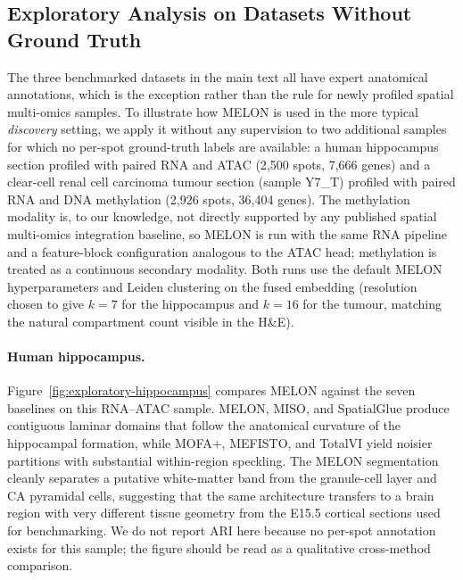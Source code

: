 \documentclass{article}
\theoremstyle{plain}
\theoremstyle{definition}
\begin{document}
\subsection{Exploratory Analysis on Datasets Without Ground Truth}\label{app:exploratory}
The three benchmarked datasets in the main text all have expert anatomical annotations, which is the exception rather than the rule for newly profiled spatial multi-omics samples. To illustrate how MELON is used in the more typical \emph{discovery} setting, we apply it without any supervision to two additional samples for which no per-spot ground-truth labels are available: a human hippocampus section profiled with paired RNA and ATAC (2{,}500 spots, 7{,}666 genes) and a clear-cell renal cell carcinoma tumour section (sample Y7\_T) profiled with paired RNA and DNA methylation (2{,}926 spots, 36{,}404 genes). The methylation modality is, to our knowledge, not directly supported by any published spatial multi-omics integration baseline, so MELON is run with the same RNA pipeline and a feature-block configuration analogous to the ATAC head; methylation is treated as a continuous secondary modality. Both runs use the default MELON hyperparameters and Leiden clustering on the fused embedding (resolution chosen to give $k{=}7$ for the hippocampus and $k{=}16$ for the tumour, matching the natural compartment count visible in the H\&E).

\paragraph{Human hippocampus.}
Figure~\ref{fig:exploratory-hippocampus} compares MELON against the seven baselines on this RNA--ATAC sample. MELON, MISO, and SpatialGlue produce contiguous laminar domains that follow the anatomical curvature of the hippocampal formation, while MOFA+, MEFISTO, and TotalVI yield noisier partitions with substantial within-region speckling. The MELON segmentation cleanly separates a putative white-matter band from the granule-cell layer and CA pyramidal cells, suggesting that the same architecture transfers to a brain region with very different tissue geometry from the E15.5 cortical sections used for benchmarking. We do not report ARI here because no per-spot annotation exists for this sample; the figure should be read as a qualitative cross-method comparison.
\end{document}
